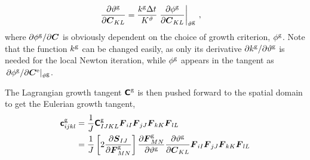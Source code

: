 \documentclass[10pt,letterpaper,oneside]{report}
\newcommand{\ten}[1]{\mbox{\boldmath $#1$}{}}
\newcommand{\tenf}[1]{\mbox{{\sffamily{\bfseries {#1}}}}}
\newcommand{\scas}[1]{\mbox{{\scriptsize{${\rm{#1}}$}}}{}}
\begin{document}
\begin{itemize}
\begin{align}
\notag \\
\frac{\partial \vartheta^{\scas{g}} }{\partial \ten{C}_{KL} } 
={}& \frac{k^{\scas{g}} \Delta t}{K^\vartheta} \left. \frac{\partial \phi^{\scas{g}} }{\partial \ten{C}_{KL} } \right|_{\vartheta^{\scas{g}}} \, , 
\end{align}
where $\partial \phi^{\scas{g}} / \partial \ten{C}$ is obviously dependent on the choice of growth criterion, $\phi^{\scas{g}}$.  Note that the function $k^{\scas{g}}$ can be changed easily, as only its derivative $ \partial k^{\scas{g}} / \partial \vartheta^{\scas{g}}$ is needed for the local Newton iteration, while $\phi^{\scas{g}}$ appears in the tangent as $\left. \partial \phi^{\scas{g}} / \partial \ten{C}^{\scas{e}} \right|_{\vartheta^{\scas{g}}}$.

The Lagrangian growth tangent $\tenf{C}^{\scas{g}}$ is then pushed forward to the spatial domain to get the Eulerian growth tangent,
\begin{align}
\tenf{c}^{\scas{g}}_{ijkl} 
={}& \frac{1}{J} \tenf{C}^{\scas{g}}_{IJKL} \ten{F}_{iI} \ten{F}_{jJ} \ten{F}_{kK} \ten{F}_{lL} 
\\
={}& \frac{1}{J} \left[ 2 \frac{\partial \ten{S}_{IJ}}{\partial \ten{F}^{\scas{g}}_{MN}} \right] \frac{\partial \ten{F}^{\scas{g}}_{MN}}{\partial \vartheta^{\scas{g}}}  \frac{ \partial \vartheta^{\scas{g}} }{ \partial \ten{C}_{KL} } \ten{F}_{iI} \ten{F}_{jJ} \ten{F}_{kK} \ten{F}_{lL} 
\notag \\

\end{align}
\end{itemize}
\end{document}
